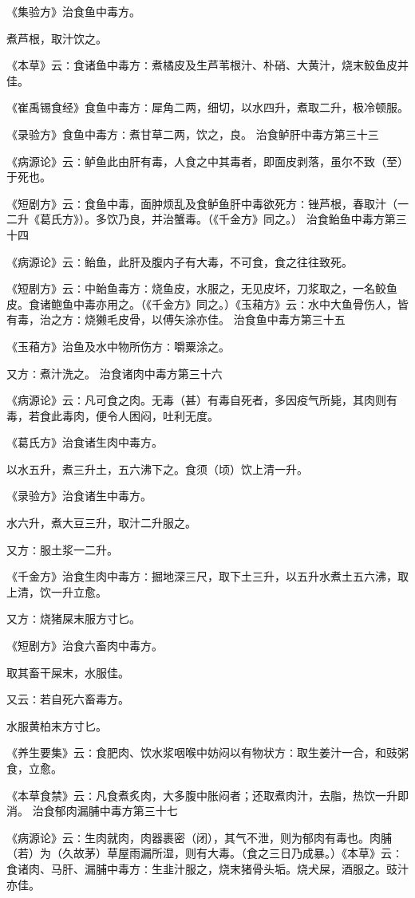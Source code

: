 \documentclass[a4paper,12pt,UTF8,twoside]{ctexbook}
\begin{document}
《集验方》治食鱼中毒方。

煮芦根，取汁饮之。

《本草》云∶食诸鱼中毒方∶煮橘皮及生芦苇根汁、朴硝、大黄汁，烧末鲛鱼皮并佳。

《崔禹锡食经》食鱼中毒方∶犀角二两，细切，以水四升，煮取二升，极冷顿服。

《录验方》食鱼中毒方∶煮甘草二两，饮之，良。
治食鲈肝中毒方第三十三

《病源论》云∶鲈鱼此由肝有毒，人食之中其毒者，即面皮剥落，虽尔不致（至）于死也。

《短剧方》云∶食鱼中毒，面肿烦乱及食鲈鱼肝中毒欲死方∶锉芦根，春取汁（一二升《葛氏方》）。多饮乃良，并治蟹毒。（《千金方》同之。）
治食鲐鱼中毒方第三十四

《病源论》云∶鲐鱼，此肝及腹内子有大毒，不可食，食之往往致死。

《短剧方》云∶中鲐鱼毒方∶烧鱼皮，水服之，无见皮坏，刀浆取之，一名鲛鱼皮。食诸鲍鱼中毒亦用之。（《千金方》同之。）《玉葙方》云∶水中大鱼骨伤人，皆有毒，治之方∶烧獭毛皮骨，以傅矢涂亦佳。
治食鱼中毒方第三十五

《玉葙方》治鱼及水中物所伤方∶嚼粟涂之。

又方∶煮汁洗之。
治食诸肉中毒方第三十六

《病源论》云∶凡可食之肉。无毒（甚）有毒自死者，多因疫气所毙，其肉则有毒，若食此毒肉，便令人困闷，吐利无度。

《葛氏方》治食诸生肉中毒方。

以水五升，煮三升土，五六沸下之。食须（顷）饮上清一升。

《录验方》治食诸生中毒方。

水六升，煮大豆三升，取汁二升服之。

又方∶服土浆一二升。

《千金方》治食生肉中毒方∶掘地深三尺，取下土三升，以五升水煮土五六沸，取上清，饮一升立愈。

又方∶烧猪屎末服方寸匕。

《短剧方》治食六畜肉中毒方。

取其畜干屎末，水服佳。

又云∶若自死六畜毒方。

水服黄柏末方寸匕。

《养生要集》云∶食肥肉、饮水浆咽喉中妨闷以有物状方∶取生姜汁一合，和豉粥食，立愈。

《本草食禁》云∶凡食煮炙肉，大多腹中胀闷者；还取煮肉汁，去脂，热饮一升即消。
治食郁肉漏脯中毒方第三十七

《病源论》云∶生肉就肉，肉器裹密（闭），其气不泄，则为郁肉有毒也。肉脯（若）为（久故茅）草屋雨漏所湿，则有大毒。（食之三日乃成暴。）《本草》云∶食诸肉、马肝、漏脯中毒方∶生韭汁服之，烧末猪骨头垢。烧犬屎，酒服之。豉汁亦佳。
\end{document}
